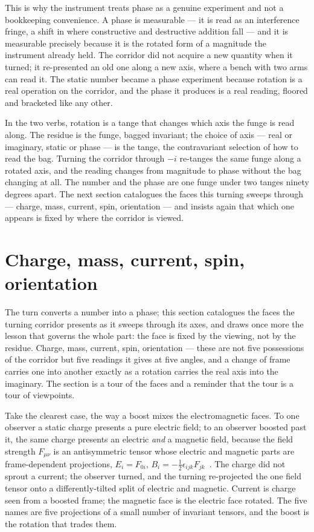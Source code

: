 This is why the instrument treats phase as a genuine experiment and not a bookkeeping convenience. A phase is measurable ---
it is read as an interference fringe, a shift in where constructive and destructive addition fall --- and it is measurable
precisely because it is the rotated form of a magnitude the instrument already held. The corridor did not acquire a new
quantity when it turned; it re-presented an old one along a new axis, where a bench with two arms can read it. The static
number became a phase experiment because rotation is a real operation on the corridor, and the phase it produces is a real
reading, floored and bracketed like any other.

In the two verbs, rotation is a tange that changes which axis the funge is read along. The residue is the funge, bagged
invariant; the choice of axis --- real or imaginary, static or phase --- is the tange, the contravariant selection of how to
read the bag. Turning the corridor through $-i$ re-tanges the same funge along a rotated axis, and the reading changes from
magnitude to phase without the bag changing at all. The number and the phase are one funge under two tanges ninety degrees
apart. The next section catalogues the faces this turning sweeps through --- charge, mass, current, spin, orientation --- and
insists again that which one appears is fixed by where the corridor is viewed.

\section{Charge, mass, current, spin, orientation}

The turn converts a number into a phase; this section catalogues the faces the turning corridor presents as it sweeps
through its axes, and draws once more the lesson that governs the whole part: the face is fixed by the viewing, not by the
residue. Charge, mass, current, spin, orientation --- these are not five possessions of the corridor but five readings it
gives at five angles, and a change of frame carries one into another exactly as a rotation carries the real axis into the
imaginary. The section is a tour of the faces and a reminder that the tour is a tour of viewpoints.

Take the clearest case, the way a boost mixes the electromagnetic faces. To one observer a static charge presents a pure
electric field; to an observer boosted past it, the same charge presents an electric \emph{and} a magnetic field, because
the field strength $F_{\mu\nu}$ is an antisymmetric tensor whose electric and magnetic parts are frame-dependent
projections, $E_i = F_{0i}$, $B_i = -\tfrac12\epsilon_{ijk}F_{jk}$~\cite{maxwell1865,lorentz1904}. The charge did not sprout
a current; the observer turned, and the turning re-projected the one field tensor onto a differently-tilted split of electric
and magnetic. Current is charge seen from a boosted frame; the magnetic face is the electric face rotated. The five names are
five projections of a small number of invariant tensors, and the boost is the rotation that trades them.

